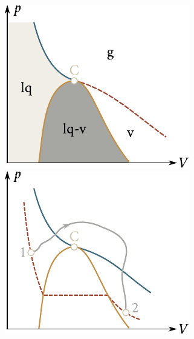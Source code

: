 \begin{figure}[!htb]
	\begin{minipage}[t]{0.5\linewidth}
		\begin{center}
			\includegraphics[scale=1]{figures/ch_15/fig_15_6.pdf}
			\caption[]{}
			\label{fig:15_6}
		\end{center}
	\end{minipage}
	\hspace{-0.05cm}
	\begin{minipage}[t]{0.5\linewidth}
		\begin{center}
			\includegraphics[scale=1]{figures/ch_15/fig_15_7.pdf}
			\caption[]{}
			\label{fig:15_7}
		\end{center}
	\end{minipage}
	\vspace{-0.4cm}
\end{figure}

